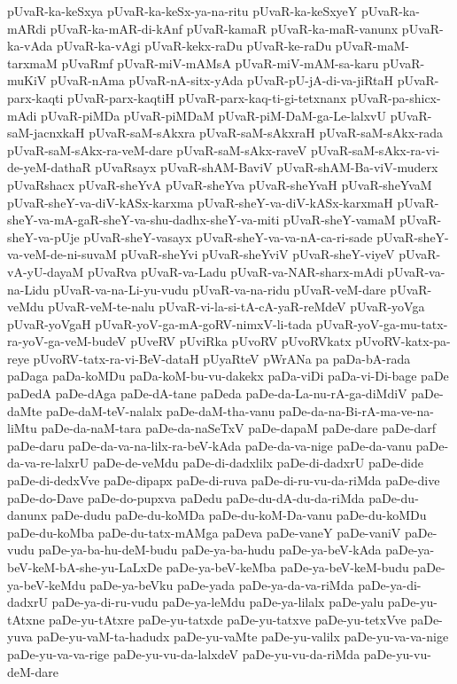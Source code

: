 {pUvaR-ka-keSxya
pUvaR-ka-keSx-ya-na-ritu
pUvaR-ka-keSxyeY
pUvaR-ka-mARdi
pUvaR-ka-mAR-di-kAnf
pUvaR-kamaR
pUvaR-ka-maR-vanunx
pUvaR-ka-vAda
pUvaR-ka-vAgi
pUvaR-kekx-raDu
pUvaR-ke-raDu
pUvaR-maM-tarxmaM
pUvaRmf
pUvaR-miV-mAMsA
pUvaR-miV-mAM-sa-karu
pUvaR-muKiV
pUvaR-nAma
pUvaR-nA-sitx-yAda
pUvaR-pU-jA-di-va-jiRtaH
pUvaR-parx-kaqti
pUvaR-parx-kaqtiH
pUvaR-parx-kaq-ti-gi-tetxnanx
pUvaR-pa-shicx-mAdi
pUvaR-piMDa
pUvaR-piMDaM
pUvaR-piM-DaM-ga-Le-lalxvU
pUvaR-saM-jacnxkaH
pUvaR-saM-sAkxra
pUvaR-saM-sAkxraH
pUvaR-saM-sAkx-rada
pUvaR-saM-sAkx-ra-veM-dare
pUvaR-saM-sAkx-raveV
pUvaR-saM-sAkx-ra-vi-de-yeM-dathaR
pUvaRsayx
pUvaR-shAM-BaviV
pUvaR-shAM-Ba-viV-muderx
pUvaRshacx
pUvaR-sheYvA
pUvaR-sheYva
pUvaR-sheYvaH
pUvaR-sheYvaM
pUvaR-sheY-va-diV-kASx-karxma
pUvaR-sheY-va-diV-kASx-karxmaH
pUvaR-sheY-va-mA-gaR-sheY-va-shu-dadhx-sheY-va-miti
pUvaR-sheY-vamaM
pUvaR-sheY-va-pUje
pUvaR-sheY-vasayx
pUvaR-sheY-va-va-nA-ca-ri-sade
pUvaR-sheY-va-veM-de-ni-suvaM
pUvaR-sheYvi
pUvaR-sheYviV
pUvaR-sheY-viyeV
pUvaR-vA-yU-dayaM
pUvaRva
pUvaR-va-Ladu
pUvaR-va-NAR-sharx-mAdi
pUvaR-va-na-Lidu
pUvaR-va-na-Li-yu-vudu
pUvaR-va-na-ridu
pUvaR-veM-dare
pUvaR-veMdu
pUvaR-veM-te-nalu
pUvaR-vi-la-si-tA-cA-yaR-reMdeV
pUvaR-yoVga
pUvaR-yoVgaH
pUvaR-yoV-ga-mA-goRV-nimxV-li-tada
pUvaR-yoV-ga-mu-tatx-ra-yoV-ga-veM-budeV
pUveRV
pUviRka
pUvoRV
pUvoRVkatx
pUvoRV-katx-pa-reye
pUvoRV-tatx-ra-vi-BeV-dataH
pUyaRteV
pWrANa
pa
paDa-bA-rada
paDaga
paDa-koMDu
paDa-koM-bu-vu-dakekx
paDa-viDi
paDa-vi-Di-bage
paDe
paDedA
paDe-dAga
paDe-dA-tane
paDeda
paDe-da-La-nu-rA-ga-diMdiV
paDe-daMte
paDe-daM-teV-nalalx
paDe-daM-tha-vanu
paDe-da-na-Bi-rA-ma-ve-na-liMtu
paDe-da-naM-tara
paDe-da-naSeTxV
paDe-dapaM
paDe-dare
paDe-darf
paDe-daru
paDe-da-va-na-lilx-ra-beV-kAda
paDe-da-va-nige
paDe-da-vanu
paDe-da-va-re-lalxrU
paDe-de-veMdu
paDe-di-dadxlilx
paDe-di-dadxrU
paDe-dide
paDe-di-dedxVve
paDe-dipapx
paDe-di-ruva
paDe-di-ru-vu-da-riMda
paDe-dive
paDe-do-Dave
paDe-do-pupxva
paDedu
paDe-du-dA-du-da-riMda
paDe-du-danunx
paDe-dudu
paDe-du-koMDa
paDe-du-koM-Da-vanu
paDe-du-koMDu
paDe-du-koMba
paDe-du-tatx-mAMga
paDeva
paDe-vaneY
paDe-vaniV
paDe-vudu
paDe-ya-ba-hu-deM-budu
paDe-ya-ba-hudu
paDe-ya-beV-kAda
paDe-ya-beV-keM-bA-she-yu-LaLxDe
paDe-ya-beV-keMba
paDe-ya-beV-keM-budu
paDe-ya-beV-keMdu
paDe-ya-beVku
paDe-yada
paDe-ya-da-va-riMda
paDe-ya-di-dadxrU
paDe-ya-di-ru-vudu
paDe-ya-leMdu
paDe-ya-lilalx
paDe-yalu
paDe-yu-tAtxne
paDe-yu-tAtxre
paDe-yu-tatxde
paDe-yu-tatxve
paDe-yu-tetxVve
paDe-yuva
paDe-yu-vaM-ta-hadudx
paDe-yu-vaMte
paDe-yu-valilx
paDe-yu-va-va-nige
paDe-yu-va-va-rige
paDe-yu-vu-da-lalxdeV
paDe-yu-vu-da-riMda
paDe-yu-vu-deM-dare
}
